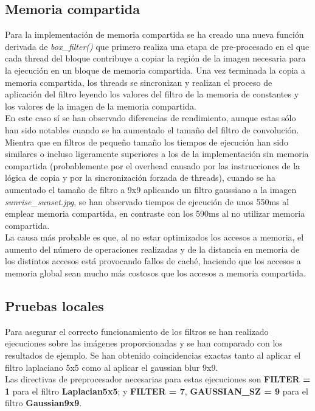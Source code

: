 \documentclass[10pt,oneside,a4paper]{article}
\begin{document}
\subsection{Memoria compartida}
Para la implementación de memoria compartida se ha creado una nueva función derivada de \textit{box\_filter()} que primero realiza una etapa de pre-procesado en el que cada thread del bloque contribuye a copiar la región de la imagen necesaria para la ejecución en un bloque de memoria compartida. Una vez terminada la copia a memoria compartida, los threads se sincronizan y realizan el proceso de aplicación del filtro leyendo los valores del filtro de la memoria de constantes y los valores de la imagen de la memoria compartida.\\

En este caso sí se han observado diferencias de rendimiento, aunque estas sólo han sido notables cuando se ha aumentado el tamaño del filtro de convolución. Mientra que en filtros de pequeño tamaño los tiempos de ejecución han sido similares o incluso ligeramente superiores a los de la implementación sin memoria compartida (probablemente por el overhead causado por las instrucciones de la lógica de copia y por la sincronización forzada de threads), cuando se ha aumentado el tamaño de filtro a 9x9 aplicando un filtro gaussiano a la imagen \textit{sunrise\_sunset.jpg}, se han observado tiempos de ejecución de unos 550ms al emplear memoria compartida, en contraste con los 590ms al no utilizar memoria compartida.\\

La causa más probable es que, al no estar optimizados los accesos a memoria, el aumento del número de operaciones realizadas y de la distancia en memoria de los distintos accesos está provocando fallos de caché, haciendo que los accesos a memoria global sean mucho más costosos que los accesos a memoria compartida.

\subsection{Pruebas locales}
Para asegurar el correcto funcionamiento de los filtros se han realizado ejecuciones sobre las imágenes proporcionadas y se han comparado con los resultados de ejemplo. Se han obtenido coincidencias exactas tanto al aplicar el filtro laplaciano 5x5 como al aplicar el gaussian blur 9x9.\\

Las directivas de preprocesador necesarias para estas ejecuciones son \textbf{FILTER = 1} para el filtro \textbf{Laplacian5x5}; y \textbf{FILTER = 7}, \textbf{GAUSSIAN\_SZ = 9} para el filtro \textbf{Gaussian9x9}.
\end{document}
